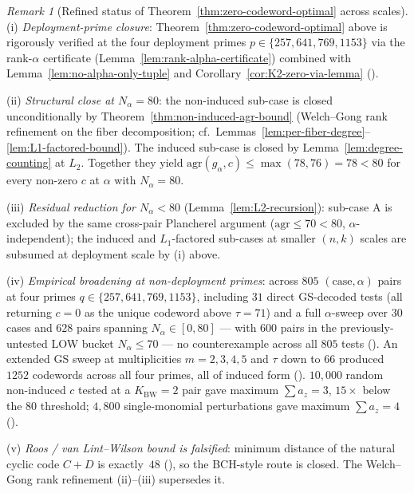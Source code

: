 \documentclass[11pt]{article}
\theoremstyle{definition}
\theoremstyle{remark}
\newtheorem{remark}[theorem]{Remark}
\begin{document}
\begin{remark}[Refined status of Theorem~\ref{thm:zero-codeword-optimal} across scales]
\label{rem:conjA-status}
(i) \emph{Deployment-prime closure}:
Theorem~\ref{thm:zero-codeword-optimal} above is rigorously verified at
the four deployment primes $p \in \{257, 641, 769, 1153\}$ via the
rank-$\alpha$ certificate (Lemma~\ref{lem:rank-alpha-certificate})
combined with Lemma~\ref{lem:no-alpha-only-tuple} and
Corollary~\ref{cor:K2-zero-via-lemma}
(\cite{CompanionRepo}).

(ii) \emph{Structural close at $N_\alpha = 80$}: the non-induced sub-case
is closed unconditionally by Theorem~\ref{thm:non-induced-agr-bound}
(Welch--Gong rank refinement on the fiber decomposition; cf.\
Lemmas~\ref{lem:per-fiber-degree}--\ref{lem:L1-factored-bound}). The
induced sub-case is closed by Lemma~\ref{lem:degree-counting} at $L_2$.
Together they yield $\mathrm{agr}(g_\alpha, c) \leq \max(78, 76) = 78 < 80$
for every non-zero $c$ at $\alpha$ with $N_\alpha = 80$.

(iii) \emph{Residual reduction for $N_\alpha < 80$} (Lemma~\ref{lem:L2-recursion}):
sub-case A is excluded by the same cross-pair Plancherel argument
($\mathrm{agr} \leq 70 < 80$, $\alpha$-independent); the induced and
$L_1$-factored sub-cases at smaller $(n, k)$ scales are subsumed at
deployment scale by (i) above.

(iv) \emph{Empirical broadening at non-deployment primes}: across $805$
$(\text{case}, \alpha)$ pairs at four primes $q \in \{257, 641, 769, 1153\}$,
including $31$ direct GS-decoded tests (all returning $c = 0$ as the unique
codeword above $\tau = 71$) and a full $\alpha$-sweep over $30$ cases and
$628$ pairs spanning $N_\alpha \in [0, 80]$ --- with $600$ pairs in the
previously-untested LOW bucket $N_\alpha \leq 70$ --- no counterexample
across all $805$ tests (\cite{CompanionRepo}). An extended
GS sweep at multiplicities $m = 2, 3, 4, 5$ and $\tau$ down to $66$ produced
$1252$ codewords across all four primes, all of induced form
(\cite{CompanionRepo}). $10{,}000$ random non-induced
$c$ tested at a $K_{\mathrm{BW}} = 2$ pair gave maximum $\sum a_z = 3$,
$15{\times}$ below the $80$ threshold; $4{,}800$ single-monomial
perturbations gave maximum $\sum a_z = 4$ (\cite{CompanionRepo}).

(v) \emph{Roos / van Lint--Wilson bound is falsified}: minimum distance
of the natural cyclic code $C + D$ is exactly~$48$
(\cite{CompanionRepo}), so the BCH-style route is closed.
The Welch--Gong rank refinement (ii)--(iii) supersedes it.
\end{remark}
\end{document}
